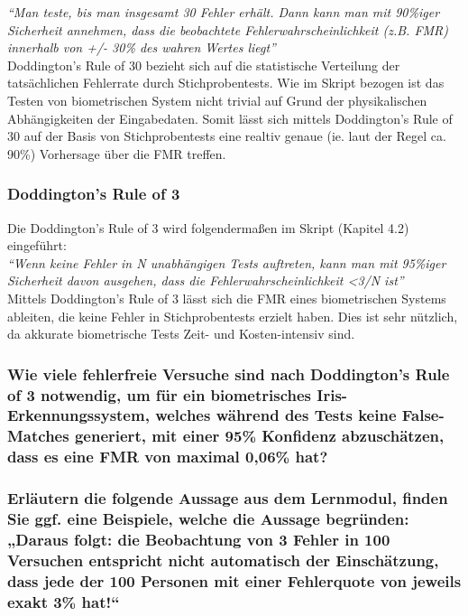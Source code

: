 \documentclass{article}
\begin{document}
\textit{``Man teste, bis man insgesamt 30 Fehler erhält. Dann kann man mit 90\%iger Sicherheit annehmen, 
dass die beobachtete Fehlerwahrscheinlichkeit (z.B. FMR) innerhalb von +/- 30\% des wahren
Wertes liegt''}\\[0.1em]

Doddington's Rule of 30 bezieht sich auf die statistische Verteilung der tatsächlichen Fehlerrate durch 
Stichprobentests. Wie im Skript bezogen ist das Testen von biometrischen System nicht trivial auf Grund 
der physikalischen Abhängigkeiten der Eingabedaten. Somit lässt sich mittels Doddington's Rule of 30 auf
der Basis von Stichprobentests eine realtiv genaue (ie. laut der Regel ca. 90\%) Vorhersage über die FMR 
treffen.

\subsubsection{Doddington’s Rule of 3}

Die Doddington's Rule of 3 wird folgendermaßen im Skript (Kapitel 4.2) eingeführt:\\[0.1em]

\textit{``Wenn keine Fehler in N unabhängigen Tests auftreten, kann man mit
95\%iger Sicherheit davon ausgehen, dass die Fehlerwahrscheinlichkeit <3/N ist''}\\[0.1em]

Mittels Doddington's Rule of 3 lässt sich die FMR eines biometrischen Systems ableiten, die keine Fehler
in Stichprobentests erzielt haben. Dies ist sehr nützlich, da akkurate biometrische Tests Zeit- und 
Kosten-intensiv sind.

\subsubsection{Wie viele fehlerfreie Versuche sind nach Doddington’s Rule of 3 notwendig, um für ein biometrisches Iris-Erkennungssystem, welches während des Tests keine False-Matches generiert, mit einer 95\% Konfidenz abzuschätzen, dass es eine FMR von maximal 0,06\% hat?
}

\subsubsection{Erläutern die folgende Aussage aus dem Lernmodul, finden Sie ggf. eine Beispiele, welche die Aussage begründen: „Daraus folgt: die Beobachtung von 3 Fehler in 100 Versuchen entspricht nicht automatisch der Einschätzung, dass jede der 100 Personen mit einer Fehlerquote von jeweils exakt 3\% hat!“
}
\end{document}
